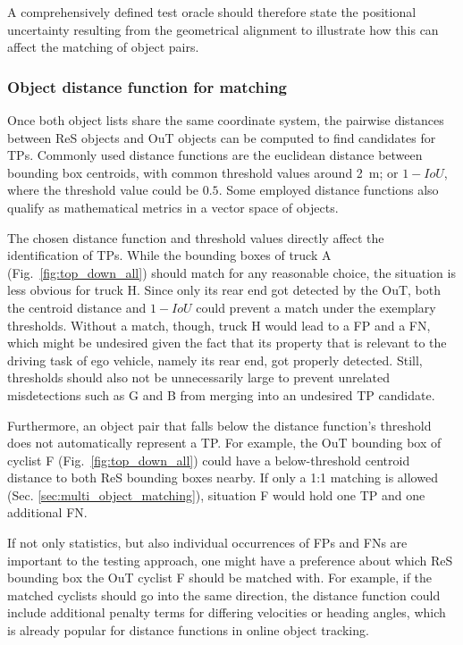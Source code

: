 \documentclass[conference]{IEEEtran}
\begin{document}
A comprehensively defined test oracle should therefore state the positional uncertainty resulting from the geometrical alignment to illustrate how this can affect the matching of object pairs.

\subsubsection{Object distance function for matching}
\label{sec:distance_function}

Once both object lists share the same coordinate system, the pairwise distances between ReS objects and OuT objects can be computed to find candidates for TPs. 
Commonly used distance functions are the euclidean distance between bounding box centroids, with common threshold values around \SI{2}{\metre}; or $1 - IoU$, where the threshold value could be $0.5$.
Some employed distance functions also qualify as mathematical metrics in a vector space of objects.

The chosen distance function and threshold values directly affect the identification of TPs. 
While the bounding boxes of truck A (Fig.~\ref{fig:top_down_all}) should match for any reasonable choice, the situation is less obvious for truck H.
Since only its rear end got detected by the OuT, both the centroid distance and $1 - IoU$ could prevent a match under the exemplary thresholds. 
Without a match, though, truck H would lead to a FP and a FN, which might be undesired given the fact that its property that is relevant to the driving task of ego vehicle, namely its rear end, got properly detected. 
Still, thresholds should also not be unnecessarily large to prevent unrelated misdetections such as G and B from merging into an undesired TP candidate.


Furthermore, an object pair that falls below the distance function's threshold does not automatically represent a TP. 
For example, the OuT bounding box of cyclist F (Fig.~\ref{fig:top_down_all}) could have a below-threshold centroid distance to both ReS bounding boxes nearby. 
If only a 1:1 matching is allowed (Sec. \ref{sec:multi_object_matching}), situation F would hold one TP and one additional FN.

If not only statistics, but also individual occurrences of FPs and FNs are important to the testing approach, one might have a preference about which ReS bounding box the OuT cyclist F should be matched with. 
For example, if the matched cyclists should go into the same direction, the distance function could include additional penalty terms for differing velocities or heading angles, which is already popular for distance functions in online object tracking. 
\end{document}
